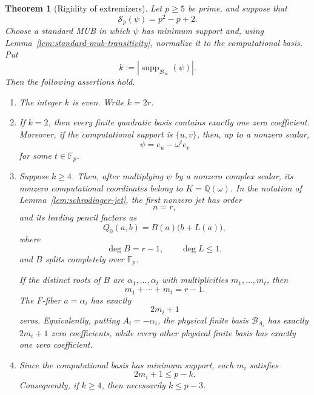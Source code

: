 \documentclass[11pt]{article}
\newtheorem{theorem}{Theorem}[section]
\newcommand{\F}{\mathbb F}
\newcommand{\supp}{\operatorname{supp}}
\begin{document}
\begin{theorem}[Rigidity of extremizers]
\label{thm:extremizer-structure}
Let \(p\ge5\) be prime, and suppose that
\[
 \mathcal S_p(\psi)=p^2-p+2.
\]
Choose a standard MUB in which \(\psi\) has minimum support and, using
Lemma~\ref{lem:standard-mub-transitivity}, normalize it to the
computational basis.  Put
\[
 k:=|\supp_{\mathcal B_\infty}(\psi)|.
\]
Then the following assertions hold.

\begin{enumerate}
\item The integer \(k\) is even.  Write \(k=2r\).

\item If \(k=2\), then every finite quadratic basis contains exactly one
zero coefficient.  Moreover, if the computational support is
\(\{u,v\}\), then, up to a nonzero scalar,
\[
 \psi=e_u-\omega^t e_v
\]
for some \(t\in\F_p\).

\item Suppose \(k\ge4\).  Then, after multiplying \(\psi\) by a nonzero
complex scalar, its nonzero computational coordinates belong to
\(K=\mathbb Q(\omega)\).  In the notation of
Lemma~\ref{lem:schrodinger-jet}, the first nonzero jet has order
\[
 n=r,
\]
and its leading pencil factors as
\begin{equation}
 Q_0(a,b)=B(a)\bigl(b+L(a)\bigr),
 \label{eq:extremizer-leading-factorization}
\end{equation}
where
\[
 \deg B=r-1,
 \qquad
 \deg L\le1,
\]
and \(B\) splits completely over \(\F_p\).

If the distinct roots of \(B\) are
\(\alpha_1,\ldots,\alpha_t\) with multiplicities
\(m_1,\ldots,m_t\), then
\begin{equation}
 m_1+\cdots+m_t=r-1.
 \label{eq:extremizer-partition}
\end{equation}
The \(F\)-fiber \(a=\alpha_i\) has exactly
\begin{equation}
 2m_i+1
 \label{eq:extremizer-exceptional-zeros}
\end{equation}
zeros.  Equivalently, putting \(A_i=-\alpha_i\), the physical finite basis
\(\mathcal B_{A_i}\) has exactly \(2m_i+1\) zero coefficients, while every
other physical finite basis has exactly one zero coefficient.

\item Since the computational basis has minimum support, each
\(m_i\) satisfies
\begin{equation}
 2m_i+1\le p-k.
 \label{eq:extremizer-minimum-support-constraint}
\end{equation}
Consequently, if \(k\ge4\), then necessarily \(k\le p-3\).
\end{enumerate}


\end{theorem}
\end{document}
